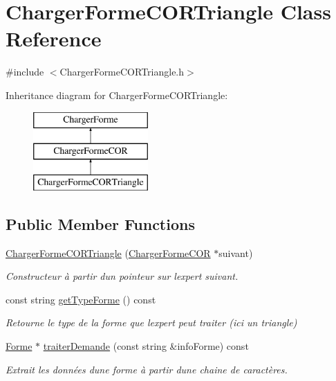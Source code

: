 \hypertarget{class_charger_forme_c_o_r_triangle}{}\section{Charger\+Forme\+C\+O\+R\+Triangle Class Reference}
\label{class_charger_forme_c_o_r_triangle}


{\ttfamily \#include $<$Charger\+Forme\+C\+O\+R\+Triangle.\+h$>$}

Inheritance diagram for Charger\+Forme\+C\+O\+R\+Triangle\+:\begin{figure}[H]
\begin{center}
\leavevmode
\includegraphics[height=3.000000cm]{class_charger_forme_c_o_r_triangle}
\end{center}
\end{figure}
\subsection*{Public Member Functions}
\begin{DoxyCompactItemize}
\item 
\hyperlink{class_charger_forme_c_o_r_triangle_ab0e825f083ba91bd938d982b5217ca8e}{Charger\+Forme\+C\+O\+R\+Triangle} (\hyperlink{class_charger_forme_c_o_r}{Charger\+Forme\+C\+OR} $\ast$suivant)
\begin{DoxyCompactList}\small\item\em Constructeur à partir d\textquotesingle{}un pointeur sur l\textquotesingle{}expert suivant. \end{DoxyCompactList}\item 
const string \hyperlink{class_charger_forme_c_o_r_triangle_a7a0271b76c6abea8c67be2c920d72925}{get\+Type\+Forme} () const
\begin{DoxyCompactList}\small\item\em Retourne le type de la forme que l\textquotesingle{}expert peut traiter (ici un triangle) \end{DoxyCompactList}\item 
\hyperlink{class_forme}{Forme} $\ast$ \hyperlink{class_charger_forme_c_o_r_triangle_aaa2b1605bb747f29a559f966754237a2}{traiter\+Demande} (const string \&info\+Forme) const
\begin{DoxyCompactList}\small\item\em Extrait les données d\textquotesingle{}une forme à partir d\textquotesingle{}une chaine de caractères. \end{DoxyCompactList}\end{DoxyCompactItemize}
